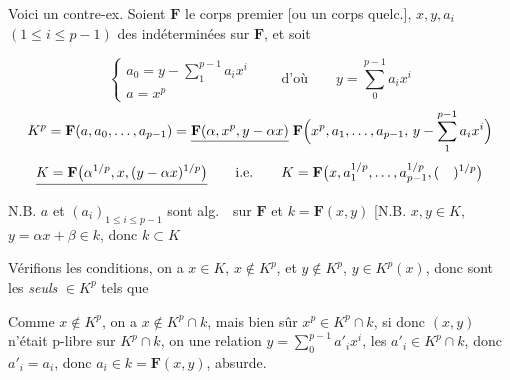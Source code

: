 \documentclass[11pt,a4paper]{article}
\begin{document}

Voici un contre-ex. Soient $\mathbf{F}$ le corps premier [ou un corps
 quelc.], $x, y, a_i$ $(1 \leq i \leq p-1)$ des
indéterminées sur $\mathbf{F}$, et soit 

 \qquad
{}

\[
  \begin{cases}
    a_0 = y - \sum_{1}^{p-1} a_i x^{i} \\
    a = x^{p}
  \end{cases}
  \qquad \text{d'où} \qquad y = \sum_{0}^{p-1} a_i x^{i}
\]
\[
  K^{p} = \mathbf{F}(a, a_0, \dots, a_{p-1})
  = \struck{\mathbf{F}(\alpha, x^{p}, y - \alpha x)}\;
    \mathbf{F}\Big(x^{p}, a_1, \dots, a_{p-1},\, y - \sum_{1}^{p-1} a_i x^{i}\Big)
\]
\[
  \struck{K = \mathbf{F}\big(\alpha^{1/p}, x, (y - \alpha x)^{1/p}\big)}
  \qquad \text{i.e.} \qquad
  K = \mathbf{F}\big(x, a_1^{1/p}, \dots, a_{p-1}^{1/p}, (\quad)^{1/p}\big)
\]
N.B. $a$ et $(a_i)_{1 \leq i \leq p-1}$ sont alg.\ \ sur
$\mathbf{F}$ et $k = \mathbf{F}(x,y)$ \quad [N.B. $x, y \in K$,
 $y = \alpha x + \beta \in k$, donc $k \subset K$

 Vérifions les conditions, on a
$x \in K$, $x \notin K^{p}$, et
$y \notin K^{p}$, $y \in K^{p}(x)$, donc 
\struck{$\alpha, \beta$} sont les \emph{seuls} $\in K^{p}$ tels que
 

Comme $x \notin K^{p}$, on a $x \notin K^{p} \cap k$, mais bien sûr
$x^{p} \in K^{p} \cap k$, si donc $(x,y)$ n'était \struck{\ill{}} p-libre sur
$K^{p} \cap k$, on  une relation
$y = \sum_{0}^{p-1} a'_i x^{i}$, les $a'_i \in K^{p} \cap k$, donc
  $a'_i = a_i$, donc
$a_i \in k = \mathbf{F}(x,y)$, absurde.
\end{document}
